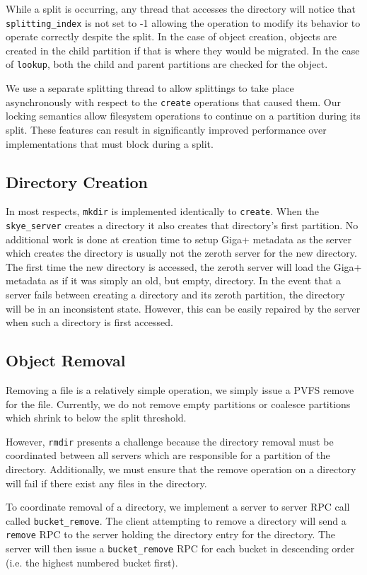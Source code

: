 \documentclass[twocolumn,letterpaper]{article}
\newcommand{\code}[1]{\texttt{#1}}
\begin{document}
While a split is occurring, any thread that accesses the directory will notice
that \code{splitting\_\-index} is not set to -1 allowing the operation to
modify its behavior to operate correctly despite the split.  In the case of
object creation, objects are created in the child partition if that is where
they would be migrated.  In the case of \code{lookup}, both the child and
parent partitions are checked for the object.

We use a separate splitting thread to allow splittings to take place
asynchronously with respect to the \code{create} operations that caused them.
Our locking semantics allow filesystem operations to continue on a partition
during its split.  These features can result in significantly improved
performance over implementations that must block during a split.

\subsection{Directory Creation}
In most respects, \code{mkdir} is implemented identically to \code{create}.
When the \code{skye\_server} creates a directory it also creates that
directory's first partition.  No additional work is done at creation time to
setup Giga+ metadata as the server which creates the directory is usually not
the zeroth server for the new directory.  The first time the new directory is
accessed, the zeroth server will load the Giga+ metadata as if it was simply
an old, but empty, directory.  In the event that a server fails between
creating a directory and its zeroth partition, the directory will be in an
inconsistent state.  However, this can be easily repaired by the server when
such a directory is first accessed.

\subsection{Object Removal}
Removing a file is a relatively simple operation, we simply issue a PVFS
remove for the file.  Currently, we do not remove empty partitions or
coalesce partitions which shrink to below the split threshold.

However, \code{rmdir} presents a challenge because the directory removal must
be coordinated between all servers which are responsible for a partition of
the directory.  Additionally, we must ensure that the remove operation on a
directory will fail if there exist any files in the directory.

To coordinate removal of a directory, we implement a server to server RPC call
called \code{bucket\_\-remove}.  The client attempting to remove a directory
will send a \code{remove} RPC to the server holding the directory entry for
the directory.  The server will then issue a \code{bucket\_\-remove} RPC for
each bucket in descending order (i.e. the highest numbered bucket first).  
\end{document}
